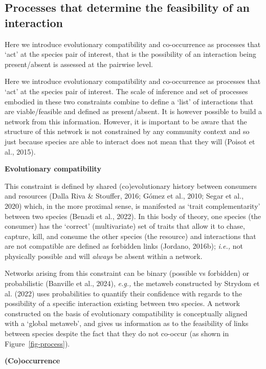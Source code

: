 \documentclass[
]{article}
\begin{document}
\subsection{Processes that determine the feasibility of an
interaction}\label{sec-process-feasibility}

Here we introduce evolutionary compatibility and co-occurrence as
processes that `act' at the species pair of interest, that is the
possibility of an interaction being present/absent is assessed at the
pairwise level.

Here we introduce evolutionary compatibility and co-occurrence as
processes that `act' at the species pair of interest. The scale of
inference and set of processes embodied in these two constraints combine
to define a `list' of interactions that are viable/feasible and defined
as present/absent. It is however possible to build a network from this
information. However, it is important to be aware that the structure of
this network is not constrained by any community context and so just
because species are able to interact does not mean that they will
(Poisot et al., 2015).

\textbf{Evolutionary compatibility}

This constraint is defined by shared (co)evolutionary history between
consumers and resources (Dalla Riva \& Stouffer, 2016; Gómez et al.,
2010; Segar et al., 2020) which, in the more proximal sense, is
manifested as `trait complementarity' between two species (Benadi et
al., 2022). In this body of theory, one species (the consumer) has the
`correct' (multivariate) set of traits that allow it to chase, capture,
kill, and consume the other species (the resource) and interactions that
are not compatible are defined as forbidden links (Jordano, 2016b);
\emph{i.e.,} not physically possible and will \emph{always} be absent
within a network.

Networks arising from this constraint can be binary (possible vs
forbidden) or probabilistic (Banville et al., 2024), \emph{e.g.,} the
metaweb constructed by Strydom et al. (2022) uses probabilities to
quantify their confidence with regards to the possibility of a specific
interaction existing between two species. A network constructed on the
basis of evolutionary compatibility is conceptually aligned with a
`global metaweb', and gives us information as to the feasibility of
links between species despite the fact that they do not co-occur (as
shown in Figure~\ref{fig-process}).

\textbf{(Co)occurrence}
\end{document}
